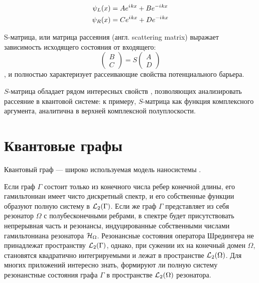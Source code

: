\begin{equation}
\begin{aligned}
   \psi_L(x) &= A e^{{i\mkern1mu} k x} + B e^{-{i\mkern1mu} k x}
\\ \psi_R(x) &= C e^{{i\mkern1mu} k x} + D e^{-{i\mkern1mu} k x}
\end{aligned}
\end{equation}

S-матрица, или  матрица рассеяния (англ. scattering matrix) выражает зависимость исходящего состояния от входящего:
\[
\begin{pmatrix} B \\ C \end{pmatrix} = S \begin{pmatrix} A \\ D \end{pmatrix}
\]
, и полностью характеризует рассеивающие свойства потенциального барьера.

$S$-матрица обладает рядом интересных свойств \cite[стр. 75]{perelomov1998quantum}, позволяющих анализировать рассеяние в квантовой системе: к примеру, $S$-матрица как функция комплексного аргумента, аналитична в верхней комплексной полуплоскости. 


\section{Квантовые графы}
Квантовый граф — широко используемая модель наносистемы \cite{kuchment2002graph, lobanov2013genetic, brown2010analysis}. 

Если граф $\Gamma$ состоит только из конечного числа ребер конечной длины, его гамильтониан имеет чисто дискретный спектр, и его собственные функции образуют полную систему в $\mathcal{L}_2(\Gamma)$. Если же граф $\Gamma$ представляет из себя резонатор $\Omega$ с полубесконечными ребрами, в спектре будет присутствовать непрерывная часть и резонансы, индуцированные собственными числами гамильтониана резонатора $\mathcal{H}_\Omega$. Резонансные состояния оператора Шредингера не принадлежат пространству $\mathcal{L}_2(\Gamma)$, однако, при сужении их на конечный домен $\Omega$, становятся квадратично интегрируемыми и лежат в пространстве $\mathcal{L}_2(\Omega)$. Для многих приложений интересно знать, формируют ли полную систему резонанстные состояния графа $\Gamma$ в пространстве $\mathcal{L}_2(\Omega)$ резонатора.

